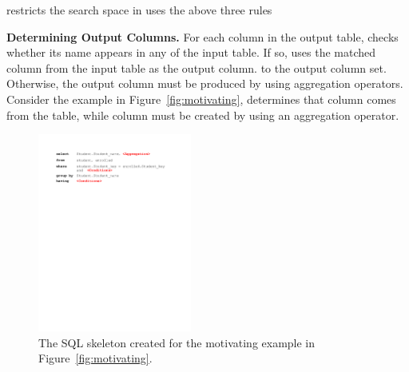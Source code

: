 \ourtool restricts the search space in uses the above three rules 


{\textbf{Determining Output Columns.}} For each
column in the output table, \ourtool checks whether its name
appears in any of the input table. If so, \ourtool uses
the matched column from the input table as the output column.
to the output column set. Otherwise, the output column
must be produced by using aggregation operators.
Consider the example in Figure~\ref{fig:motivating},
\ourtool determines that column {} comes from the 
table, while column {} must be created by using an aggregation operator.

\vspace{1mm}



\begin{figure}[t]
	\centering
		\includegraphics[width=0.45\textwidth]{sql_skeleton.pdf}
	\caption{The SQL skeleton created for the motivating example
in Figure~\ref{fig:motivating}.}
	\label{fig:skeleton}
\end{figure}

